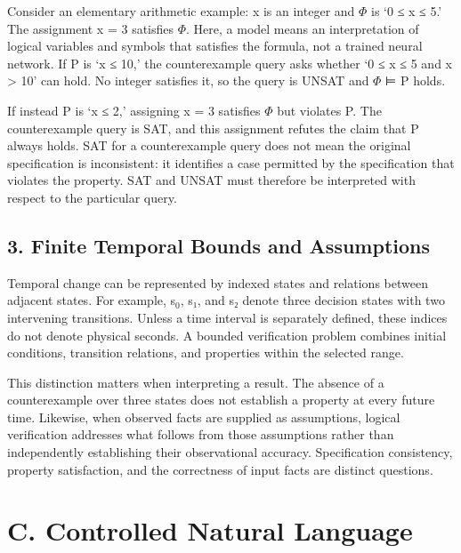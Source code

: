 \documentclass[11pt,a4paper]{article}
\begin{document}
Consider an elementary arithmetic example: x is an integer and \ensuremath{\Phi} is ‘0 ≤ x ≤ 5.’ The assignment x = 3 satisfies \ensuremath{\Phi}. Here, a model means an interpretation of logical variables and symbols that satisfies the formula, not a trained neural network. If P is ‘x ≤ 10,’ the counterexample query asks whether ‘0 ≤ x ≤ 5 and x > 10’ can hold. No integer satisfies it, so the query is UNSAT and \ensuremath{\Phi} ⊨ P holds.\par

If instead P is ‘x ≤ 2,’ assigning x = 3 satisfies \ensuremath{\Phi} but violates P. The counterexample query is SAT, and this assignment refutes the claim that P always holds. SAT for a counterexample query does not mean the original specification is inconsistent: it identifies a case permitted by the specification that violates the property. SAT and UNSAT must therefore be interpreted with respect to the particular query.\par

\subsection*{3. Finite Temporal Bounds and Assumptions}

Temporal change can be represented by indexed states and relations between adjacent states. For example, s\ensuremath{{}_0}, s₁, and s₂ denote three decision states with two intervening transitions. Unless a time interval is separately defined, these indices do not denote physical seconds. A bounded verification problem combines initial conditions, transition relations, and properties within the selected range.\par

This distinction matters when interpreting a result. The absence of a counterexample over three states does not establish a property at every future time. Likewise, when observed facts are supplied as assumptions, logical verification addresses what follows from those assumptions rather than independently establishing their observational accuracy. Specification consistency, property satisfaction, and the correctness of input facts are distinct questions.\par

\section*{C. Controlled Natural Language}
\end{document}

